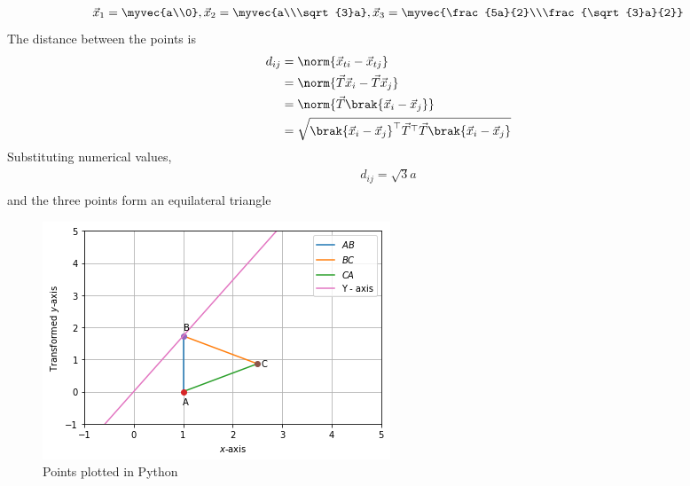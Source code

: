  \begin{align}
  \vec{x}_1 = \myvec{a\\0}, \vec{x}_2 = \myvec{a\\\sqrt{3}a}, \vec{x}_3 =\myvec{\frac{5a}{2}\\\frac{\sqrt{3}a}{2}} \label{2/4/2/eq:1.0.5}    
 \end{align}
The distance between the points is 
\begin{align}
d_{ij} &= \norm{\vec{x}_{ti}-\vec{x}_{tj}} \label{2/4/2/eq:1.1.7}
\\
& = \norm{\vec{T}\vec{x}_{i}-\vec{T}\vec{x}_{j}} \label{2/4/2/eq:1.1.8}
\\
& = \norm{\vec{T}\brak{\vec{x}_{i}-\vec{x}_{j}}} \label{2/4/2/eq:1.1.123}
\\
&= \sqrt{\brak{\vec{x}_{i}-\vec{x}_{j}}^\top \vec{T}^\top\vec{T}\brak{\vec{x}_{i}-\vec{x}_{j}}}  \label{2/4/2/eq:1.1.9}
\end{align}
Substituting numerical values, 
\begin{align}
d_{ij} = \sqrt{3}a \\
\end{align}
and the three points form an equilateral triangle
\begin{figure}[!ht]
    \includegraphics[width=\columnwidth]{2/solution/4/2/tri.png}
    \caption{Points plotted in Python}
    \label{2/4/2/Fig2: Points plotted in Python}
\end{figure}

